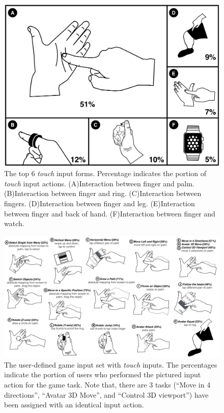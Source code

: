 \documentclass{sigchi}
\begin{document}
   \begin{figure}[!h]
    \centering
    \includegraphics[width=1\columnwidth]{OnBodyForms.pdf}
    \caption{The top 6 \emph{touch} input forms. Percentage indicates the portion of \emph{touch} input actions. (A)Interaction between finger and palm. (B)Interaction between finger and ring. (C)Interaction between fingers. (D)Interaction between finger and leg. (E)Interaction between finger and back of hand. (F)Interaction between finger and watch.}
    \label{fig:figureOnBodyPorpotion}
    \end{figure}   


  \begin{figure}
  \centering
  \includegraphics[width=1\textwidth]{OnBodyInputSet.pdf}
  \caption{The user-defined game input set with \emph{touch} inputs. The percentages indicate the portion of users who performed the pictured input action for the game task. Note that, there are 3 tasks (``Move in 4 directions'', ``Avatar 3D Move'', and ``Control 3D viewport'') have been assigned with an identical input action.}
  \label{fig:OnBodyInputSet}
  \end{figure}
\end{document}
